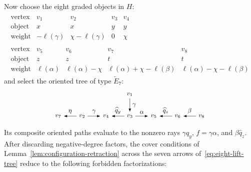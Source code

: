 Now choose the eight graded objects in $H$:
\begin{equation}
  \begin{gathered}
  \begin{array}{c|rrrr}
  \text{vertex}&v_1&v_2&v_3&v_4\\ \hline
  \text{object}&x&x&y&y\\
  \text{weight}&-\ell(\gamma)&\chi-\ell(\gamma)&0&\chi
  \end{array}
  \\[1ex]
  \begin{array}{c|rrrr}
  \text{vertex}&v_5&v_6&v_7&v_8\\ \hline
  \text{object}&z&z&t&t\\
  \text{weight}&\ell(\alpha)&\ell(\alpha)-\chi&\ell(\alpha)+\chi-\ell(\beta)&\ell(\alpha)-\chi-\ell(\beta)
  \end{array}
  \end{gathered}
  \label{eq:eight-lift-coordinates}
\end{equation}
and select the oriented tree of type $\widetilde E_7$:
\begin{equation}
\begin{tikzpicture}[>=Latex,x=1.2cm,y=1.1cm,every node/.style={font=\small}]
\node (G) at (0,0) {$v_7$}; \node (B) at (1,0) {$v_2$};
\node (D) at (2,0) {$v_4$}; \node (C) at (3,0) {$v_3$};
\node (E) at (4,0) {$v_5$}; \node (F) at (5,0) {$v_6$};
\node (H) at (6,0) {$v_8$}; \node (A) at (3,1) {$v_1$};
\draw[->] (B)--node[above] {$\eta$}(G);
\draw[->] (B)--node[above] {$\gamma$}(D);
\draw[->] (C)--node[above] {$\widehat q_y$}(D);
\draw[->] (C)--node[above] {$\alpha$}(E);
\draw[->] (F)--node[above] {$\widehat q_z$}(E);
\draw[->] (H)--node[above] {$\beta$}(F);
\draw[->] (A)--node[right] {$\gamma$}(C);
\end{tikzpicture}
\label{eq:eight-lift-tree}
\end{equation}
Its composite oriented paths evaluate to the nonzero rays $\gamma\widehat q_y$, $f=\gamma\alpha$, and $\beta\widehat q_z$. After discarding negative-degree factors, the cover conditions of Lemma~\ref{lem:configuration-retraction} across the seven arrows of~\eqref{eq:eight-lift-tree} reduce to the following forbidden factorizations:
